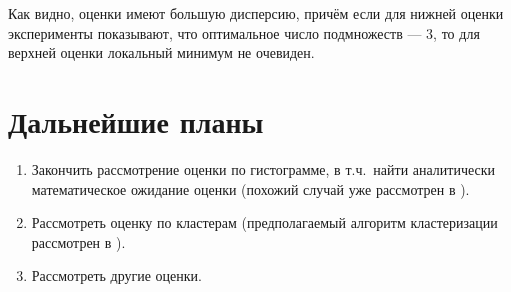 \documentclass[specialist,
               substylefile = spbu.rtx,
               subf,href,colorlinks=true, 12pt]{disser}
\begin{document}
\conclusion
	Как видно, оценки имеют большую дисперсию, причём если для нижней оценки эксперименты показывают, что оптимальное число подмножеств --- 3, то для верхней оценки локальный минимум не очевиден.

\section*{Дальнейшие планы}
	\begin{enumerate}
		\item Закончить рассмотрение оценки по гистограмме, в т.ч.\ найти аналитически математическое ожидание оценки (похожий случай уже рассмотрен в \citep{montekarlo1975}).
		\item Рассмотреть оценку по кластерам (предполагаемый алгоритм кластеризации рассмотрен в \citep{Arthur2007}).
		\item Рассмотреть другие оценки.
	\end{enumerate}
\nocite{*}



\appendix
\end{document}
